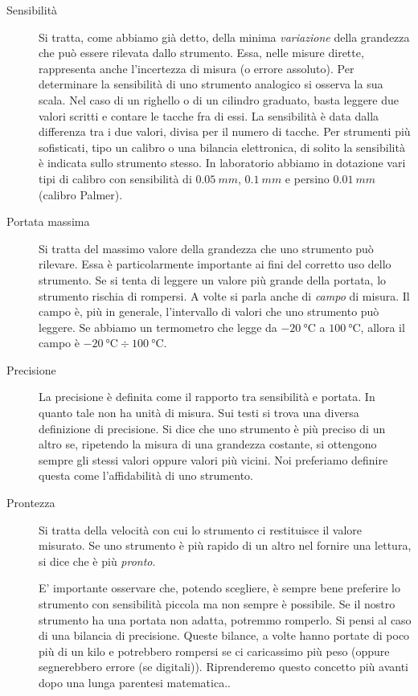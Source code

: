 \documentclass[12pt,a4paper,oneside]{book}
\theoremstyle{esercizio}
\begin{document}
\begin{description}
\item[Sensibilità] Si tratta, come abbiamo già detto, della minima \textit{variazione} della grandezza che può essere rilevata dallo strumento. Essa, nelle misure dirette, rappresenta anche l'incertezza di misura (o errore assoluto). Per determinare la sensibilità di uno strumento analogico si osserva la sua scala. Nel caso di un righello o di un cilindro graduato, basta leggere due valori scritti e contare le tacche fra di essi. La sensibilità è data dalla differenza tra i due valori, divisa per il numero di tacche. Per strumenti più sofisticati, tipo un calibro o una bilancia elettronica, di solito la sensibilità è indicata sullo strumento stesso. In laboratorio abbiamo in dotazione vari tipi di calibro con sensibilità di $\SI{0,05}{mm}$, $\SI{0,1}{mm}$ e persino $\SI{0,01}{mm}$ (calibro Palmer).
\item[Portata massima] Si tratta del massimo valore della grandezza che uno strumento può rilevare. Essa è particolarmente importante ai fini del corretto uso dello strumento. Se si tenta di leggere un valore più grande della portata, lo strumento rischia di rompersi. A volte si parla anche di \textit{campo} di misura. Il campo è, più in generale, l'intervallo di valori che uno strumento può leggere. Se abbiamo un termometro che legge da $\SI{-20}{\celsius}$ a $\SI{100}{\celsius}$, allora il campo è $\SI{-20}{\celsius}\div\SI{100}{\celsius}$. 


\item[Precisione] La precisione è definita come il rapporto tra sensibilità e portata. In quanto tale non ha unità di misura. Sui testi si trova una diversa definizione di precisione. Si dice che uno strumento è più preciso di un altro se, ripetendo la misura di una grandezza costante, si ottengono sempre gli stessi valori oppure valori più vicini. Noi preferiamo definire questa come l'affidabilità di uno strumento.
\item[Prontezza] Si tratta della velocità con cui lo strumento ci restituisce il valore misurato. Se uno strumento è più rapido di un altro nel fornire una lettura, si dice che è più \textit{pronto}.

E' importante osservare che, potendo scegliere, è sempre bene preferire lo strumento con sensibilità piccola ma non sempre è possibile. Se il nostro strumento ha una portata non adatta, potremmo romperlo. Si pensi al caso di una bilancia di precisione. Queste bilance, a volte hanno portate di poco più di un kilo e potrebbero rompersi se ci caricassimo più peso (oppure segnerebbero errore (se digitali)). Riprenderemo questo concetto più avanti dopo una lunga parentesi matematica..
\end{description}
\end{document}
